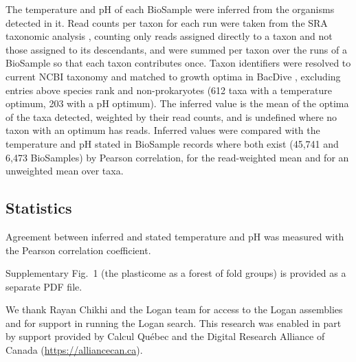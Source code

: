 \documentclass[pdflatex,sn-nature,iicol]{sn-jnl}%
\begin{document}
The temperature and pH of each BioSample were inferred from the organisms detected in it. Read counts per taxon for each run were taken from the SRA taxonomic analysis \citep{katz2021stat}, counting only reads assigned directly to a taxon and not those assigned to its descendants, and were summed per taxon over the runs of a BioSample so that each taxon contributes once. Taxon identifiers were resolved to current NCBI taxonomy and matched to growth optima in BacDive \citep{reimer2022bacdive}, excluding entries above species rank and non-prokaryotes (612 taxa with a temperature optimum, 203 with a pH optimum). The inferred value is the mean of the optima of the taxa detected, weighted by their read counts, and is undefined where no taxon with an optimum has reads. Inferred values were compared with the temperature and pH stated in BioSample records where both exist (45,741 and 6,473 BioSamples) by Pearson correlation, for the read-weighted mean and for an unweighted mean over taxa. %


\subsection{Statistics}

Agreement between inferred and stated temperature and pH was measured with the Pearson correlation coefficient.

\backmatter


Supplementary Fig.~1 (the plasticome as a forest of fold groups) is provided as a separate PDF file.


We thank Rayan Chikhi and the Logan team for access to the Logan assemblies and for support in running the Logan search. This research was enabled in part by support provided by Calcul Qu\'ebec and the Digital Research Alliance of Canada (\url{https://alliancecan.ca}).
\end{document}

